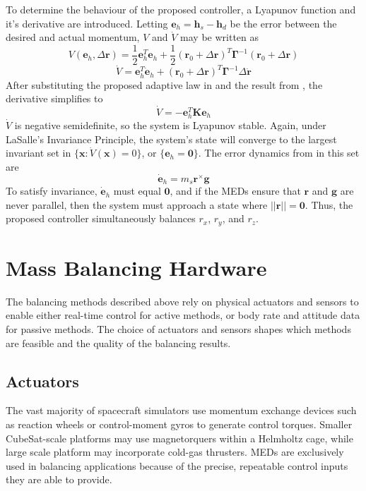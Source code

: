To determine the behaviour of the proposed controller, a Lyapunov function and it's derivative are introduced. Letting $\bm{e}_h=\bm{h}_s-\bm{h}_d$ be the error between the desired and actual momentum, $V$ and $\dot{V}$ may be written as
\begin{equation}
    V(\bm{e}_h,\Delta\bm{r})=\frac{1}{2}\bm{e}_h^T\bm{e}_h
    +\frac{1}{2}(\bm{r}_0+\Delta\bm{r})^T\bm{\Gamma}^{-1}(\bm{r}_0+\Delta\bm{r})
\end{equation}
\begin{equation}
    \dot{V}=\bm{e}_h^T\dot{\bm{e}}_h
    +(\bm{r}_0+\Delta\bm{r})^T\bm{\Gamma}^{-1}\Delta\dot{\bm{r}}
\end{equation}
After substituting the proposed adaptive law in  and the result from , the derivative simplifies to 
\begin{equation}
    \dot{V}=-\bm{e}_h^T\bm{K}\bm{e}_h
\end{equation}
$\dot{V}$ is negative semidefinite, so the system is Lyapunov stable. Again, under LaSalle's Invariance Principle, the system's state will converge to the largest invariant set in $\{\bm{x}:\dot V(\bm{x})=0 \}$, or $\{\bm{e}_h=\bm{0}\}$. The error dynamics from  in this set are
\begin{equation}
    \dot{\bm{e}}_h=m_s\bm{r}^{\times}\bm{g}
\end{equation}
To satisfy invariance, $\dot{\bm{e}}_h$ must equal $\bm{0}$, and if the MEDs ensure that $\bm{r}$ and ${\bm{g}}$ are never parallel, then the system must approach a state where $||\bm{r}||=\bm{0}$. Thus, the proposed controller simultaneously balances $r_x$, $r_y$, and $r_z$. 

\section{Mass Balancing Hardware}

The balancing methods described above rely on physical actuators and sensors to enable either real-time control for active methods, or body rate and attitude data for passive methods. The choice of actuators and sensors shapes which methods are feasible and the quality of the balancing results.

\subsection{Actuators}

The vast majority of spacecraft simulators use momentum exchange devices such as reaction wheels or control-moment gyros to generate control torques. Smaller CubeSat-scale platforms may use magnetorquers within a Helmholtz cage, while large scale platform may incorporate cold-gas thrusters. MEDs are exclusively used in balancing applications because of the precise, repeatable control inputs they are able to provide. 

